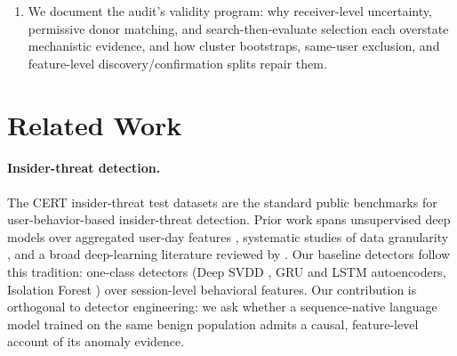 \documentclass[10pt]{article} %
\begin{document}
\begin{enumerate}[leftmargin=1.3em]
users with the profile present sits at chance and removing profile content
from adaptation and scoring restores it to $0.90$ (descriptive paired
bootstrap interval excluding zero); the same removal is small and
non-significant in the audited $3$B run, a model-dependent difference not
isolated as capacity, and the psychometric line is the carrier. On raw
enterprise authentication logs with no injected profile
(Section~\ref{sec:lanl}) a seen-versus-unseen gap appears, but its pools
differ in user composition as well as training exposure, so it does not yet
test the account. The resulting two-factor
account: population structure governs when an identity shortcut is
available; objective and representation govern which detectors take it; and
profile content in the serialization is causally responsible for the
binding in the audited run.
\item We document the audit's validity program: why receiver-level
uncertainty, permissive donor matching, and search-then-evaluate selection
each overstate mechanistic evidence, and how cluster bootstraps, same-user
exclusion, and feature-level discovery/confirmation splits repair them.
\end{enumerate}

\section{Related Work}

\paragraph{Insider-threat detection.}
The CERT insider-threat test datasets \citep{glasser2013bridging,certdataset}
are the standard public benchmarks for user-behavior-based insider-threat
detection. Prior work spans unsupervised deep models over aggregated user-day
features \citep{tuor2017deep}, systematic studies of data granularity
\citep{le2020analyzing}, and a broad deep-learning literature reviewed by
\citet{yuan2021deep}. Our baseline detectors follow this tradition: one-class
detectors (Deep SVDD \citep{ruff2018deepsvdd}, GRU and LSTM autoencoders,
Isolation Forest \citep{liu2008isolation}) over session-level behavioral
features. Our contribution is orthogonal to detector engineering: we ask
whether a sequence-native language model trained on the same benign population
admits a causal, feature-level account of its anomaly evidence.
\end{document}

